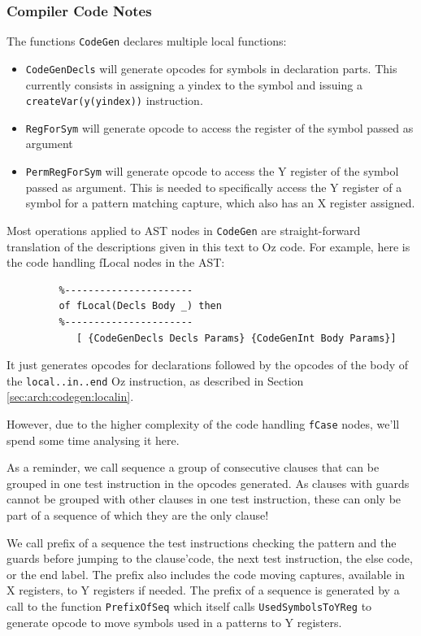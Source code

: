 \documentclass[a4paper]{memoir}
\begin{document}
\subsubsection{Compiler Code Notes}
The functions \lstinline!CodeGen! declares multiple local functions:
\begin{itemize}
  \item \lstinline!CodeGenDecls! will generate opcodes for symbols in
    declaration parts. This currently consists in assigning a yindex to the
    symbol and issuing a \lstinline!createVar(y(yindex))! instruction.
  \item \lstinline!RegForSym! will generate opcode to access the register of the
    symbol passed as argument
  \item \lstinline!PermRegForSym! will generate opcode to access the Y register
    of the symbol passed as argument. This is needed to specifically access the
    Y register of a symbol for a pattern matching capture, which also has an X
    register assigned.
\end{itemize}

Most operations applied to AST nodes in \lstinline!CodeGen! are straight-forward translation of the
descriptions given in this text to Oz code. For example, here is the
code handling fLocal nodes in the AST:

\begin{lstlisting}
         %----------------------
         of fLocal(Decls Body _) then
         %----------------------
            [ {CodeGenDecls Decls Params} {CodeGenInt Body Params}]
\end{lstlisting}

It just generates opcodes for declarations followed by the opcodes of the body
of the \lstinline!local..in..end! Oz instruction, as described in Section
\ref{sec:arch:codegen:localin}.

However, due to the higher complexity of the code handling \lstinline!fCase! nodes, we'll
spend some time analysing it here.

As a reminder, we call sequence a group of consecutive clauses that can be
grouped in one test instruction in the opcodes generated. As clauses with guards
cannot be grouped with other clauses in one test instruction, these
can only be part of a sequence of which they are the only clause!

We call prefix of a sequence the test
instructions checking the pattern and the guards before jumping to the
clause'code, the next test instruction, the else code, or the end label.
The prefix also includes the code moving captures, available in X registers,
to Y registers if needed.
The prefix of a sequence is generated by a call to the function
\lstinline!PrefixOfSeq! which itself calls \lstinline!UsedSymbolsToYReg! to
generate opcode to move symbols used in a patterns to Y registers.
\end{document}
